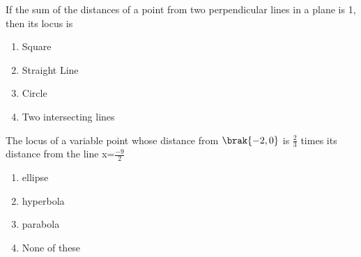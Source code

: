 \iffalse
  \title{Trignometric Functions and Equations}
  \author{EE24BTECH11006- Arnav Mahishi}
  \section{mcq-single}
\fi
\item{ If the sum of the distances of a point from two perpendicular lines in a plane is 1, then its locus is \hfill{}
\begin{enumerate}[label=(\alph*)]
    \item Square
    \item Straight Line
    \item Circle
    \item Two intersecting lines
\end{enumerate}}

\item{ The locus of a variable point whose distance from $\brak{-2,0}$ is 
$\frac{2}{3}$ times its distance from the line x=$\frac{-9}{2}$ \hfill{}
\begin{enumerate}[label=(\alph*)]
    \item ellipse
    \item hyperbola
    \item parabola
    \item None of these
\end{enumerate}}

